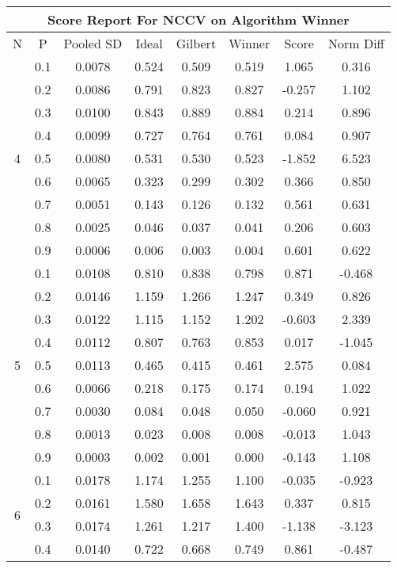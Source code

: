 \documentclass[11pt,a4paper]{report}
\begin{document}
\begin{longtable}{ | c | c || c | c | c | c | c | c | }
\hline
\multicolumn{8}{|c|}{ Score Report For NCCV on Algorithm Winner} \\
\hline
N & P & Pooled SD &  Ideal &  Gilbert & Winner  & Score & Norm Diff \\
 \hline
 \hline
 \endhead
\multirow{9}{*}{4} & 0.1 & 0.0078 & 0.524 & 0.509 & 0.519 & 1.065 & 0.316 \\
 & 0.2 & 0.0086 & 0.791 & 0.823 & 0.827 & -0.257 & 1.102 \\
 & 0.3 & 0.0100 & 0.843 & 0.889 & 0.884 & 0.214 & 0.896 \\
 & 0.4 & 0.0099 & 0.727 & 0.764 & 0.761 & 0.084 & 0.907 \\
 & 0.5 & 0.0080 & 0.531 & 0.530 & 0.523 & -1.852 & 6.523 \\
 & 0.6 & 0.0065 & 0.323 & 0.299 & 0.302 & 0.366 & 0.850 \\
 & 0.7 & 0.0051 & 0.143 & 0.126 & 0.132 & 0.561 & 0.631 \\
 & 0.8 & 0.0025 & 0.046 & 0.037 & 0.041 & 0.206 & 0.603 \\
 & 0.9 & 0.0006 & 0.006 & 0.003 & 0.004 & 0.601 & 0.622 \\
 \hline
\multirow{9}{*}{5} & 0.1 & 0.0108 & 0.810 & 0.838 & 0.798 & 0.871 & -0.468 \\
 & 0.2 & 0.0146 & 1.159 & 1.266 & 1.247 & 0.349 & 0.826 \\
 & 0.3 & 0.0122 & 1.115 & 1.152 & 1.202 & -0.603 & 2.339 \\
 & 0.4 & 0.0112 & 0.807 & 0.763 & 0.853 & 0.017 & -1.045 \\
 & 0.5 & 0.0113 & 0.465 & 0.415 & 0.461 & 2.575 & 0.084 \\
 & 0.6 & 0.0066 & 0.218 & 0.175 & 0.174 & 0.194 & 1.022 \\
 & 0.7 & 0.0030 & 0.084 & 0.048 & 0.050 & -0.060 & 0.921 \\
 & 0.8 & 0.0013 & 0.023 & 0.008 & 0.008 & -0.013 & 1.043 \\
 & 0.9 & 0.0003 & 0.002 & 0.001 & 0.000 & -0.143 & 1.108 \\
 \hline
\multirow{9}{*}{6} & 0.1 & 0.0178 & 1.174 & 1.255 & 1.100 & -0.035 & -0.923 \\
 & 0.2 & 0.0161 & 1.580 & 1.658 & 1.643 & 0.337 & 0.815 \\
 & 0.3 & 0.0174 & 1.261 & 1.217 & 1.400 & -1.138 & -3.123 \\
 & 0.4 & 0.0140 & 0.722 & 0.668 & 0.749 & 0.861 & -0.487 \\

\end{longtable}
\end{document}

